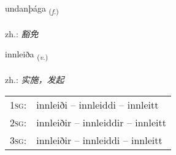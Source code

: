 \documentclass[frontgrid, backgrid]{flacards}\usepackage[]{graphicx}\usepackage[]{xcolor}
\begin{document}
\renewcommand{\flhead}{\vskip5pt \fboxsep=0pt {\small\bfseries\footnotesize Nafnorð | 名词}}
\renewcommand{\fcfoot}{\vskip5pt \fboxsep=0pt \hspace{2pt}{\small\bfseries\footnotesize 3K}}

\renewcommand{\blhead}{\vskip5pt {\small\bfseries\footnotesize Nafnorð | 名词 }}
\renewcommand{\bcfoot}{\vskip5pt \hspace{2pt}{\small\bfseries\footnotesize 3K}}


{undanþága \small{\textsubscript{(\textit{f.})}} \\[1ex] %
\textphonetic{[ʏntanθauɣa]} \\
zh.: \emph{豁免} \\  [2ex]
\renewcommand*{\arraystretch}{0.8}
}

\renewcommand{\flhead}{\vskip5pt \fboxsep=0pt {\small\bfseries\footnotesize Sagnorð | 动词}}
\renewcommand{\fcfoot}{\vskip5pt \fboxsep=0pt \hspace{2pt}{\small\bfseries\footnotesize 3K}}

\renewcommand{\blhead}{\vskip5pt {\small\bfseries\footnotesize Sagnorð | 动词 }}
\renewcommand{\bcfoot}{\vskip5pt \hspace{2pt}{\small\bfseries\footnotesize 3K}}


{innleiða \small{\textsubscript{(\textit{v.})}} \\[1ex] %
\textphonetic{[ɪnleiða]} \\
zh.: \emph{实施，发起} \\  [2ex]
\renewcommand*{\arraystretch}{0.8}
\begin{tabular}{p{1cm}l}
\textsc{1sg}: & innleiði -- innleiddi -- innleitt \\ 
\textsc{2sg}: & innleiðir -- innleiddir -- innleitt \\ 
\textsc{3sg}: & innleiðir -- innleiddi -- innleitt \\ 
\end{tabular}
}
\end{document}
